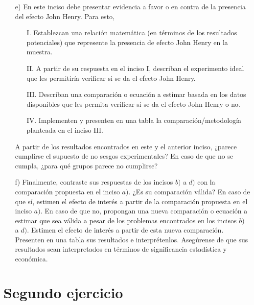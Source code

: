 \documentclass[a4paper]{article}
\begin{document}
\begin{itemize}
    
    \item[e)] En este inciso debe presentar evidencia a favor o en contra de la presencia del efecto John Henry. Para esto,
    \begin{itemize}
        \item[I.] Establezcan una relación matemática (en términos de los resultados potenciales) que represente la presencia de efecto John Henry en la muestra. 
        \item[II.] A partir de su respuesta en el inciso I, describan el experimento ideal que les permitiría verificar si se da el efecto John Henry.   
        \item[III.] Describan una comparación o ecuación a estimar basada en los datos disponibles que les permita verificar si se da el efecto John Henry o no.
        \item[IV.] Implementen y presenten en una tabla la comparación/metodología planteada en el inciso III.
    \end{itemize}
    A partir de los resultados encontrados en este y el anterior inciso, ¿parece cumplirse el supuesto de no sesgos experimentales? En caso de que no se cumpla, ¿para qué grupos parece no cumplirse?\\
    \item[f)] Finalmente, contraste sus respuestas de los incisos $b)$ a $d)$ con la comparación propuesta en el inciso $a)$. ¿Es su comparación válida? En caso de que sí, estimen el efecto de interés a partir de la comparación propuesta en el inciso $a)$. En caso de que no, propongan una nueva comparación o ecuación a estimar que sea válida a pesar de los problemas encontrados en los incisos $b)$ a $d)$. Estimen el efecto de interés a partir de esta nueva comparación. Presenten en una tabla sus resultados e interprétenlos. Asegúrense de que sus resultados sean interpretados en términos de significancia estadística y económica.\\

\end{itemize}

\bigskip

\section*{Segundo ejercicio}
\end{document}
